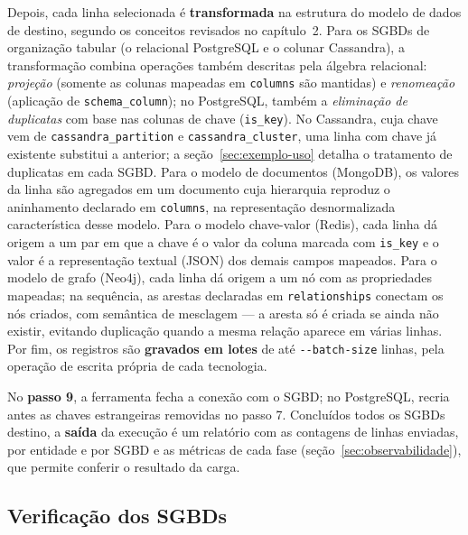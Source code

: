 Depois, cada linha selecionada é \textbf{transformada} na estrutura do modelo de dados de
destino, segundo os conceitos revisados no capítulo~2. Para os SGBDs de organização
tabular (o relacional PostgreSQL e o colunar Cassandra), a transformação combina operações
também descritas pela álgebra relacional: \textit{projeção} (somente as colunas mapeadas em
\texttt{columns} são mantidas) e \textit{renomeação} (aplicação de \texttt{schema\_column});
no PostgreSQL, também a \textit{eliminação de duplicatas} com base nas colunas de chave
(\texttt{is\_key}). No Cassandra, cuja chave vem de \texttt{cassandra\_partition} e
\texttt{cassandra\_cluster}, uma linha com chave já existente substitui a anterior; a
seção~\ref{sec:exemplo-uso} detalha o tratamento de duplicatas em cada SGBD. Para o modelo de documentos
(MongoDB), os valores da linha são agregados em um documento cuja hierarquia reproduz o
aninhamento declarado em \texttt{columns}, na representação desnormalizada característica
desse modelo. Para o modelo chave-valor (Redis), cada linha dá origem a um par em que a
chave é o valor da coluna marcada com \texttt{is\_key} e o valor é a representação
textual (JSON) dos demais campos mapeados. Para o modelo de grafo (Neo4j), cada linha dá
origem a um nó com as propriedades mapeadas; na sequência, as arestas declaradas em
\texttt{relationships} conectam os nós criados, com semântica de mesclagem --- a aresta
só é criada se ainda não existir, evitando duplicação quando a mesma relação aparece em
várias linhas. Por fim, os registros são \textbf{gravados em lotes} de até
\texttt{-{}-batch-size} linhas, pela operação de escrita própria de cada tecnologia.

No \textbf{passo 9}, a ferramenta fecha a conexão com o SGBD; no PostgreSQL, recria
antes as chaves estrangeiras removidas no passo 7. Concluídos todos os SGBDs destino, a
\textbf{saída} da execução é um relatório com as contagens de linhas enviadas, por
entidade e por SGBD e as métricas de cada fase (seção~\ref{sec:observabilidade}), que
permite conferir o resultado da carga.

\subsection{Verificação dos SGBDs}
\label{sec:verificacao-sgbds}

